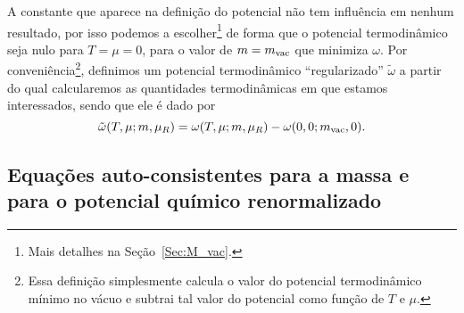 A constante que aparece na definição do potencial não tem influência em nenhum resultado, por isso podemos a escolher\footnote{Mais detalhes na Seção~\ref{Sec:M_vac}.} de forma que o potencial termodinâmico seja nulo para $T = \mu = 0$, para o valor de $m = m_{\rm{vac}}$ que minimiza $\omega$. Por conveniência\footnote{Essa definição simplesmente calcula o valor do potencial termodinâmico mínimo no vácuo e subtrai tal valor do potencial como função de $T$ e $\mu$.}, definimos um potencial termodinâmico ``regularizado'' $\tilde\omega$ a partir do qual calcularemos as quantidades termodinâmicas em que estamos interessados, sendo que ele é dado por
\begin{equation}
	\tilde\omega(T, \mu; m, \mu_R) = \omega(T, \mu; m, \mu_R) - \omega(0, 0; m_{\rm{vac}}, 0).
\end{equation}

\subsection{Equações auto-consistentes para a massa e para o potencial químico renormalizado}

